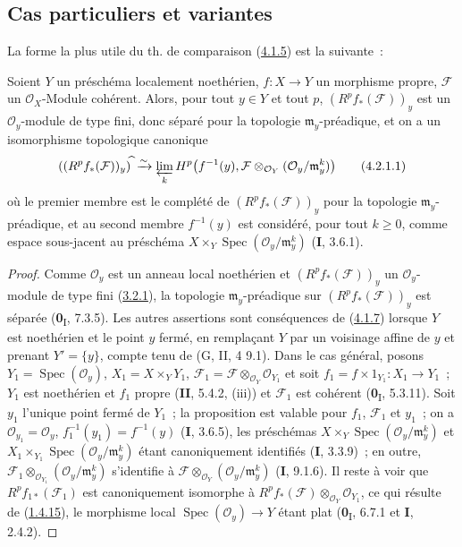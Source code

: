 \subsection{Cas particuliers et variantes}
\label{subsection:III.4.2-fr}

La forme la plus utile du th. de comparaison
(\hyperref[III.4.1.5-fr]{4.1.5}) est la suivante~:

\begin{proposition}[4.2.1]
\label{III.4.2.1-fr}
Soient $Y$ un préschéma localement noethérien, $f:X\to Y$ un morphisme
propre, $\mathcal F$ un $\mathcal O_X$-Module cohérent. Alors, pour tout
$y\in Y$ et tout $p$, $(R^pf_*(\mathcal F))_y$ est
un $\mathcal O_y$-module de type fini, donc séparé pour la topologie
$\mathfrak m_y$-préadique, et on a un isomorphisme topologique canonique
\[
((R^pf_*(\mathcal F))_y)^{\widehat{\,}}
\xrightarrow{\sim}
\varprojlim_kH^p\bigl(f^{-1}(y),
\mathcal F\otimes_{\mathcal O_Y}(\mathcal O_y/\mathfrak m_y^k)\bigr)
\tag{4.2.1.1}\label{III.4.2.1.1-fr}
\]
où le premier membre est le complété de $(R^pf_*(\mathcal F))_y$ pour la
topologie $\mathfrak m_y$-préadique, et au second membre $f^{-1}(y)$ est
considéré, pour tout $k\geq0$, comme espace sous-jacent au préschéma
$X\times_Y\operatorname{Spec}(\mathcal O_y/\mathfrak m_y^k)$
\textup{(\textbf{I}, 3.6.1)}.
\end{proposition}

\begin{proof}
Comme $\mathcal O_y$ est un anneau local noethérien et
$(R^pf_*(\mathcal F))_y$ un $\mathcal O_y$-module de type fini
(\hyperref[III.3.2.1-fr]{3.2.1}), la topologie $\mathfrak m_y$-préadique
sur $(R^pf_*(\mathcal F))_y$ est séparée (\textbf{0}\textsubscript{I}, 7.3.5). Les
autres assertions sont conséquences de (\hyperref[III.4.1.7-fr]{4.1.7})
lorsque $Y$ est noethérien et le point $y$ fermé, en remplaçant $Y$ par un
voisinage affine de $y$ et prenant $Y'=\{y\}$, compte tenu de
(G, II, 4 9.1). Dans le cas général, posons
$Y_1=\operatorname{Spec}(\mathcal O_y)$, $X_1=X\times_YY_1$,
$\mathcal F_1=\mathcal F\otimes_{\mathcal O_Y}\mathcal O_{Y_1}$
et soit $f_1=f\times1_{Y_1}:X_1\to Y_1$~; $Y_1$ est noethérien et $f_1$
propre (\textbf{II}, 5.4.2, (iii)) et $\mathcal F_1$ est cohérent
(\textbf{0}\textsubscript{I}, 5.3.11). Soit $y_1$ l'unique point fermé de $Y_1$~;
la proposition est valable pour $f_1$, $\mathcal F_1$ et $y_1$~; on a
$\mathcal O_{y_1}=\mathcal O_y$, $f_1^{-1}(y_1)=f^{-1}(y)$ (\textbf{I}, 3.6.5),
les préschémas
$X\times_Y\operatorname{Spec}(\mathcal O_y/\mathfrak m_y^k)$ et
$X_1\times_{Y_1}\operatorname{Spec}(\mathcal O_y/\mathfrak m_y^k)$ étant
canoniquement identifiés (\textbf{I}, 3.3.9)~; en outre,
$\mathcal F_1\otimes_{\mathcal O_{Y_1}}
(\mathcal O_y/\mathfrak m_y^k)$ s'identifie à
$\mathcal F\otimes_{\mathcal O_Y}(\mathcal O_y/\mathfrak m_y^k)$
(\textbf{I}, 9.1.6). Il reste à voir que $R^pf_{1*}(\mathcal F_1)$ est
canoniquement isomorphe à
$R^pf_*(\mathcal F)\otimes_{\mathcal O_Y}\mathcal O_{Y_1}$, ce qui
résulte de (\hyperref[III.1.4.15-fr]{1.4.15}), le morphisme local
$\operatorname{Spec}(\mathcal O_y)\to Y$ étant plat
(\textbf{0}\textsubscript{I}, 6.7.1 et \textbf{I}, 2.4.2).
\end{proof}

